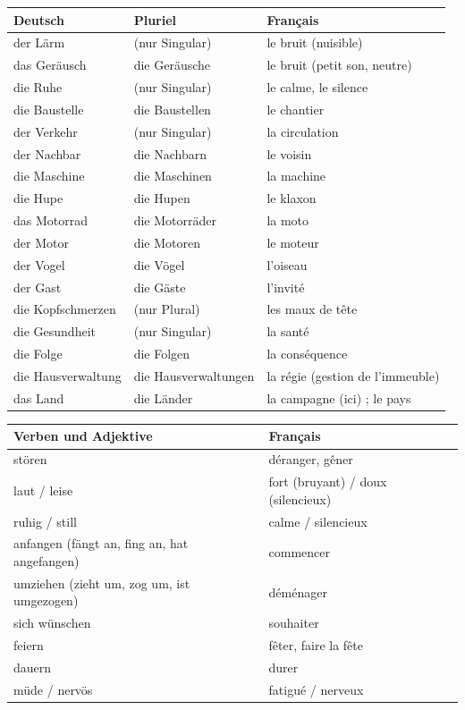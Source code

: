 \documentclass[11pt]{article}
\begin{document}
\begin{center}
\begin{tabularx}{\linewidth}{|l|l|X|}
\hline
\rowcolor{popblueL} \textbf{Deutsch} & \textbf{Pluriel} & \textbf{Français} \\
\hline
der Lärm & (nur Singular) & le bruit (nuisible) \\
\hline
das Geräusch & die Geräusche & le bruit (petit son, neutre) \\
\hline
die Ruhe & (nur Singular) & le calme, le silence \\
\hline
die Baustelle & die Baustellen & le chantier \\
\hline
der Verkehr & (nur Singular) & la circulation \\
\hline
der Nachbar & die Nachbarn & le voisin \\
\hline
die Maschine & die Maschinen & la machine \\
\hline
die Hupe & die Hupen & le klaxon \\
\hline
das Motorrad & die Motorräder & la moto \\
\hline
der Motor & die Motoren & le moteur \\
\hline
der Vogel & die Vögel & l'oiseau \\
\hline
der Gast & die Gäste & l'invité \\
\hline
die Kopfschmerzen & (nur Plural) & les maux de tête \\
\hline
die Gesundheit & (nur Singular) & la santé \\
\hline
die Folge & die Folgen & la conséquence \\
\hline
die Hausverwaltung & die Hausverwaltungen & la régie (gestion de l'immeuble) \\
\hline
das Land & die Länder & la campagne (ici) ; le pays \\
\hline
\end{tabularx}
\end{center}

\begin{center}
\begin{tabularx}{\linewidth}{|l|X|}
\hline
\rowcolor{popblueL} \textbf{Verben und Adjektive} & \textbf{Français} \\
\hline
stören & déranger, gêner \\
\hline
laut / leise & fort (bruyant) / doux (silencieux) \\
\hline
ruhig / still & calme / silencieux \\
\hline
anfangen (fängt an, fing an, hat angefangen) & commencer \\
\hline
umziehen (zieht um, zog um, ist umgezogen) & déménager \\
\hline
sich wünschen & souhaiter \\
\hline
feiern & fêter, faire la fête \\
\hline
dauern & durer \\
\hline
müde / nervös & fatigué / nerveux \\
\hline
\end{tabularx}
\end{center}
\end{document}
